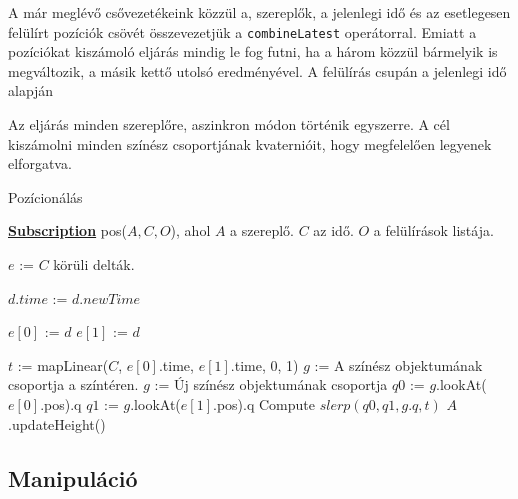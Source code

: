 A már meglévő csővezetékeink közzül a, szereplők, a jelenlegi idő és az esetlegesen felülírt pozíciók csövét összevezetjük a \lstinline[columns=fixed]{combineLatest} operátorral. Emiatt a pozíciókat kiszámoló eljárás mindig le fog futni, ha a három közzül bármelyik is megváltozik, a másik kettő utolsó eredményével. A felülírás csupán a jelenlegi idő alapján

Az eljárás minden szereplőre, aszinkron módon történik egyszerre. A cél kiszámolni minden színész csoportjának kvaternióit\cite{Quaternion}, hogy megfelelően legyenek elforgatva.

\begin{algorithm}[H]
	\caption{Pozícionálás}
	\label{alg:ibb}
	\textbf{\underline{Subscription}} pos($A, C, O$), ahol $A$ a szereplő. $C$ az idő. $O$ a felülírások listája.
	\begin{algorithmic}[1] %
	\STATE $e$ := $C$ körüli delták.

					\STATE $d.time$ := $d.newTime$
				\ENDIF
			\ENDFOR

				\STATE $e[0]$ := $d$
			\ENDIF
				\STATE $e[1]$ := $d$
			\ENDIF

		\ENDFOR
	\ENDIF

	\STATE $t$ := mapLinear($C$, $e[0]$.time, $e[1]$.time, 0, 1)
	\STATE $g$ := A színész objektumának csoportja a színtéren.  
		\STATE $g$ := Új színész objektumának csoportja
	\ENDIF
	\STATE $q0$ := $g$.lookAt($e[0]$.pos).q 
	\STATE $q1$ := $g$.lookAt($e[1]$.pos).q 
		\STATE Compute $slerp(q0, q1, g.q, t)$ 
	\ENDIF  {}
	\STATE $A$.updateHeight() 
	\end{algorithmic}
\end{algorithm}


\subsection{Manipuláció}


